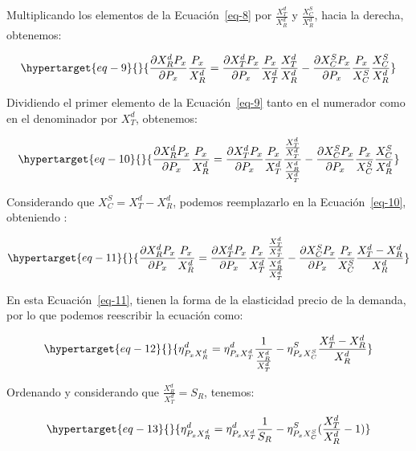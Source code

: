\documentclass[
  a4paper,
]{article}
\theoremstyle{definition}
\theoremstyle{remark}
\begin{document}
Multiplicando los elementos de la Ecuación~\ref{eq-8} por
\(\frac{X_T^d}{X_R^d}\) y \(\frac{X_C^S}{X_R^d}\), hacia la derecha,
obtenemos:

\begin{equation}\protect\hypertarget{eq-9}{}{
\frac{\partial X_R^d P_x}{\partial P_x} \frac{P_x}{X_R^d} = \frac{\partial X_T^d P_x}{\partial P_x} \frac{P_x}{X_T^d} \frac{X_T^d}{X_R^d} - \frac{\partial X_C^S P_x}{\partial P_x} \frac{P_x}{X_C^S} \frac{X_C^S}{X_R^d}
}\label{eq-9}\end{equation}

Dividiendo el primer elemento de la Ecuación~\ref{eq-9} tanto en el
numerador como en el denominador por \(X_T^d\), obtenemos:

\begin{equation}\protect\hypertarget{eq-10}{}{
\frac{\partial X_R^d P_x}{\partial P_x} \frac{P_x}{X_R^d} = \frac{\partial X_T^d P_x}{\partial P_x} \frac{P_x}{X_T^d} \frac{\frac{X_T^d}{X_T^d}}{\frac{X_R^d}{X_T^d}} - \frac{\partial X_C^S P_x}{\partial P_x} \frac{P_x}{X_C^S} \frac{X_C^S}{X_R^d}
}\label{eq-10}\end{equation}

Considerando que \(X_C^S = X_T^d - X_R^d\), podemos reemplazarlo en la
Ecuación~\ref{eq-10}, obteniendo :

\begin{equation}\protect\hypertarget{eq-11}{}{
\frac{\partial X_R^d P_x}{\partial P_x} \frac{P_x}{X_R^d} = \frac{\partial X_T^d P_x}{\partial P_x} \frac{P_x}{X_T^d} \frac{\frac{X_T^d}{X_T^d}}{\frac{X_R^d}{X_T^d}} - \frac{\partial X_C^S P_x}{\partial P_x} \frac{P_x}{X_C^S} \frac{X_T^d - X_R^d}{X_R^d}
}\label{eq-11}\end{equation}

En esta Ecuación~\ref{eq-11}, tienen la forma de la elasticidad precio
de la demanda, por lo que podemos reescribir la ecuación como:

\begin{equation}\protect\hypertarget{eq-12}{}{
\eta_{P_{x}X_R^d}^d = \eta_{P_{x}X_T^d}^d \frac{1}{\frac{X_R^d}{X_T^d}} - \eta_{P_{x}X_C^S}^S \frac{X_T^d - X_R^d}{X_R^d}
}\label{eq-12}\end{equation}

Ordenando y considerando que \(\frac{X_R^d}{X_T^d} = S_R\), tenemos:

\begin{equation}\protect\hypertarget{eq-13}{}{
\eta_{P_{x}X_R^d}^d = \eta_{P_{x}X_T^d}^d \frac{1}{S_R} - \eta_{P_{x}X_C^S}^S (\frac{X_T^d}{X_R^d} - 1)
}\label{eq-13}\end{equation}
\end{document}
